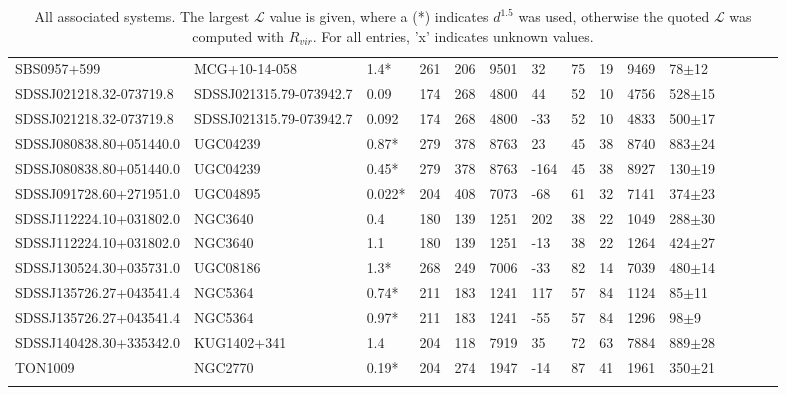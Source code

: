 \documentclass[iop]{emulateapj-rtx4}
\begin{document}
\begin{table}[ht]
\begin{center}
\begin{tabular}{l l l l l l l l l l l l l l l}
SBS0957+599  &  MCG+10-14-058  &  1.4*  &  261  &  206  &  9501  &  32  &  75  &  19  &  9469  &  78$\pm$12  \\
SDSSJ021218.32-073719.8  &  SDSSJ021315.79-073942.7  &  0.09  &  174  &  268  &  4800  &  44  &  52  &  10  &  4756  &  528$\pm$15  \\
SDSSJ021218.32-073719.8  &  SDSSJ021315.79-073942.7  &  0.092  &  174  &  268  &  4800  &  -33  &  52  &  10  &  4833  &  500$\pm$17  \\
SDSSJ080838.80+051440.0  &  UGC04239  &  0.87*  &  279  &  378  &  8763  &  23  &  45  &  38  &  8740  &  883$\pm$24  \\
SDSSJ080838.80+051440.0  &  UGC04239  &  0.45*  &  279  &  378  &  8763  &  -164  &  45  &  38  &  8927  &  130$\pm$19  \\
SDSSJ091728.60+271951.0  &  UGC04895  &  0.022*  &  204  &  408  &  7073  &  -68  &  61  &  32  &  7141  &  374$\pm$23  \\
SDSSJ112224.10+031802.0  &  NGC3640  &  0.4  &  180  &  139  &  1251  &  202  &  38  &  22  &  1049  &  288$\pm$30  \\
SDSSJ112224.10+031802.0  &  NGC3640  &  1.1  &  180  &  139  &  1251  &  -13  &  38  &  22  &  1264  &  424$\pm$27  \\
SDSSJ130524.30+035731.0  &  UGC08186  &  1.3*  &  268  &  249  &  7006  &  -33  &  82  &  14  &  7039  &  480$\pm$14  \\
SDSSJ135726.27+043541.4  &  NGC5364  &  0.74*  &  211  &  183  &  1241  &  117  &  57  &  84  &  1124  &  85$\pm$11  \\
SDSSJ135726.27+043541.4  &  NGC5364  &  0.97*  &  211  &  183  &  1241  &  -55  &  57  &  84  &  1296  &  98$\pm$9  \\
SDSSJ140428.30+335342.0  &  KUG1402+341  &  1.4  &  204  &  118  &  7919  &  35  &  72  &  63  &  7884  &  889$\pm$28  \\
TON1009  &  NGC2770  &  0.19*  &  204  &  274  &  1947  &  -14  &  87  &  41  &  1961  &  350$\pm$21  \\

 \\
\hline
\end{tabular}
\end{center}
  \caption{\small{All associated systems. The largest $\mathcal{L}$ value is given, where a (\**) indicates $d^{1.5}$ was used, otherwise the quoted $\mathcal{L}$ was computed with $R_{vir}$. For all entries, 'x' indicates unknown values.}}
  \label{target_table}
\end{table}
\end{document}
